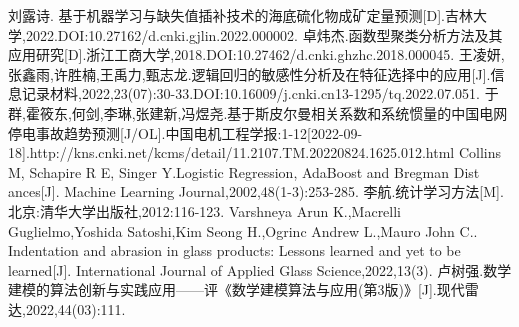 \begin{thebibliography}{9}%
	刘露诗. 基于机器学习与缺失值插补技术的海底硫化物成矿定量预测[D].吉林大学,2022.DOI:10.27162/d.cnki.gjlin.2022.000002.
	卓炜杰.函数型聚类分析方法及其应用研究[D].浙江工商大学,2018.DOI:10.27462/d.cnki.ghzhc.2018.000045.
	王凌妍,张鑫雨,许胜楠,王禹力,甄志龙.逻辑回归的敏感性分析及在特征选择中的应用[J].信息记录材料,2022,23(07):30-33.DOI:10.16009/j.cnki.cn13-1295/tq.2022.07.051.
	于群,霍筱东,何剑,李琳,张建新,冯煜尧.基于斯皮尔曼相关系数和系统惯量的中国电网停电事故趋势预测[J/OL].中国电机工程学报:1-12[2022-09-18].http://kns.cnki.net/kcms/detail/11.2107.TM.20220824.1625.012.html
	Collins M, Schapire R E, Singer Y.Logistic Regression, AdaBoost and Bregman Dist ances[J]. Machine Learning Journal,2002,48(1-3):253-285.
	李航.统计学习方法[M].北京:清华大学出版社,2012:116-123.
	Varshneya Arun K.,Macrelli Guglielmo,Yoshida Satoshi,Kim Seong H.,Ogrinc Andrew L.,Mauro John C.. Indentation and abrasion in glass products: Lessons learned and yet to be learned[J]. International Journal of Applied Glass Science,2022,13(3).
	卢树强.数学建模的算法创新与实践应用——评《数学建模算法与应用(第3版)》[J].现代雷达,2022,44(03):111.
\end{thebibliography}